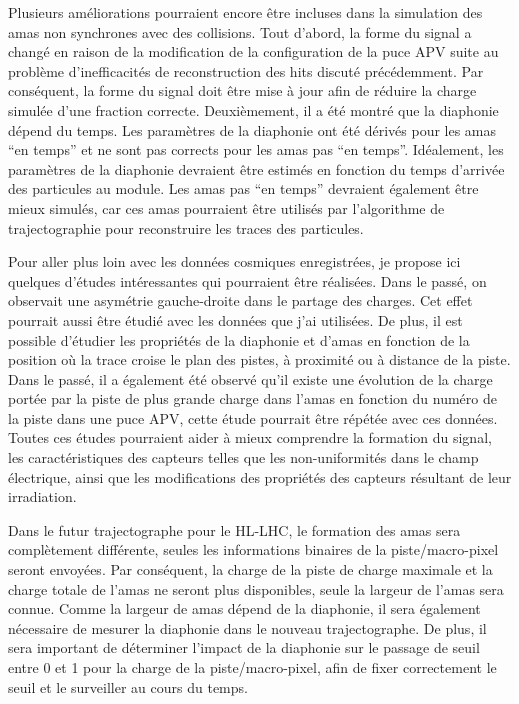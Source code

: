 Plusieurs améliorations pourraient encore être incluses dans la simulation des amas non synchrones avec des collisions. Tout d'abord, la forme du signal a changé en raison de la modification de la configuration de la puce APV suite au problème d'inefficacités de reconstruction des hits discuté précédemment. Par conséquent, la forme du signal doit être mise à jour afin de réduire la charge simulée d'une fraction correcte. Deuxièmement, il a été montré que la diaphonie dépend du temps. Les paramètres de la diaphonie ont été dérivés pour les amas ``en temps'' et ne sont pas corrects pour les amas pas ``en temps''. Idéalement, les paramètres de la diaphonie devraient être estimés en fonction du temps d'arrivée des particules au module. Les amas pas ``en temps'' devraient également être mieux simulés, car ces amas pourraient être utilisés par l’algorithme de trajectographie pour reconstruire les traces des particules.


Pour aller plus loin avec les données cosmiques enregistrées, je propose ici quelques d’études intéressantes qui pourraient être réalisées. Dans le passé, on observait une asymétrie gauche-droite dans le partage des charges. Cet effet pourrait aussi être étudié avec les données que j'ai utilisées. De plus, il est possible d'étudier les propriétés de la diaphonie et d'amas en fonction de la position où la trace croise le plan des pistes, à proximité ou à distance de la piste. Dans le passé, il a également été observé qu’il existe une évolution de la charge portée par la piste de plus grande charge dans l'amas en fonction du numéro de la piste dans une puce APV, cette étude pourrait être répétée avec ces données. Toutes ces études pourraient aider à mieux comprendre la formation du signal, les caractéristiques des capteurs telles que les non-uniformités dans le champ électrique, ainsi que les modifications des propriétés des capteurs résultant de leur irradiation.

Dans le futur trajectographe pour le HL-LHC, le formation des amas sera complètement différente, seules les informations binaires de la piste/macro-pixel seront envoyées. Par conséquent, la charge de la piste de charge maximale et la charge totale de l'amas ne seront plus disponibles, seule la largeur de l'amas sera connue. Comme la largeur de amas dépend de la diaphonie, il sera également nécessaire de mesurer la diaphonie dans le nouveau trajectographe. De plus, il sera important de déterminer l'impact de la diaphonie sur le passage de seuil entre 0 et 1 pour la charge de la piste/macro-pixel, afin de fixer correctement le seuil et le surveiller au cours du temps.

